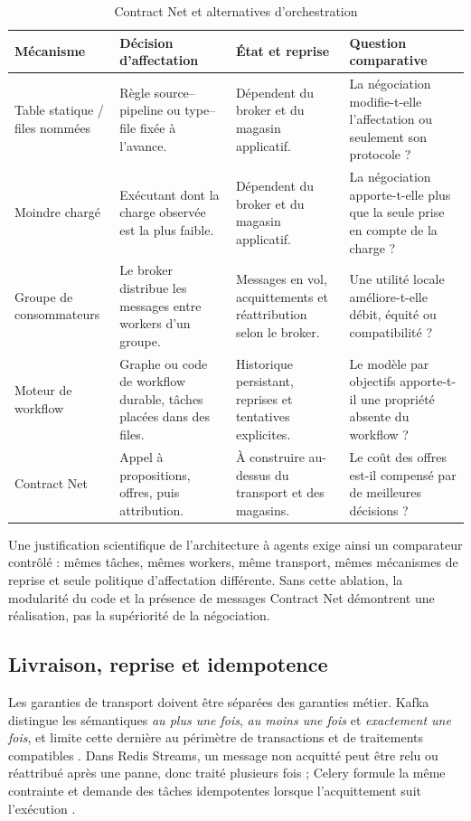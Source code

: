\begin{table}[H]
\centering
\caption{Contract Net et alternatives d'orchestration}
\label{tab:concurrents-orchestration}
\scriptsize
\begin{tabularx}{\textwidth}{p{2.3cm}p{3cm}p{3.2cm}X}
\toprule
\textbf{Mécanisme} & \textbf{Décision d'affectation} & \textbf{État et reprise} &
\textbf{Question comparative} \\
\midrule
Table statique / files nommées & Règle source--pipeline ou type--file fixée à l'avance. &
Dépendent du broker et du magasin applicatif. &
La négociation modifie-t-elle l'affectation ou seulement son protocole ? \\
Moindre chargé & Exécutant dont la charge observée est la plus faible. &
Dépendent du broker et du magasin applicatif. &
La négociation apporte-t-elle plus que la seule prise en compte de la charge ? \\
Groupe de consommateurs & Le broker distribue les messages entre workers d'un groupe. &
Messages en vol, acquittements et réattribution selon le broker. &
Une utilité locale améliore-t-elle débit, équité ou compatibilité ? \\
Moteur de workflow & Graphe ou code de workflow durable, tâches placées dans des files. &
Historique persistant, reprises et tentatives explicites. &
Le modèle par objectifs apporte-t-il une propriété absente du workflow ? \\
Contract Net & Appel à propositions, offres, puis attribution. &
À construire au-dessus du transport et des magasins. &
Le coût des offres est-il compensé par de meilleures décisions ? \\
\bottomrule
\end{tabularx}
\end{table}

Une justification scientifique de l'architecture à agents exige ainsi un comparateur contrôlé : mêmes tâches, mêmes workers, même transport, mêmes mécanismes de reprise et seule politique d'affectation différente. Sans cette ablation, la modularité du code et la présence de messages Contract Net démontrent une réalisation, pas la supériorité de la négociation.

\subsection{Livraison, reprise et idempotence}

Les garanties de transport doivent être séparées des garanties métier. Kafka distingue les sémantiques \textit{au plus une fois}, \textit{au moins une fois} et \textit{exactement une fois}, et limite cette dernière au périmètre de transactions et de traitements compatibles \cite{kafka2026semantics}. Dans Redis Streams, un message non acquitté peut être relu ou réattribué après une panne, donc traité plusieurs fois \cite{redis2026streams} ; Celery formule la même contrainte et demande des tâches idempotentes lorsque l'acquittement suit l'exécution \cite{celery2026tasks}.

